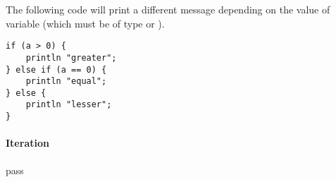 The following code will print a different message depending on the value of variable  (which must be of type  or ).
\begin{lstlisting}[language=Gryph]
if (a > 0) {
	println "greater";
} else if (a == 0) {
	println "equal";
} else {
	println "lesser";
}
\end{lstlisting}

\paragraph{Iteration}
\label{sec:iteration}
pass
